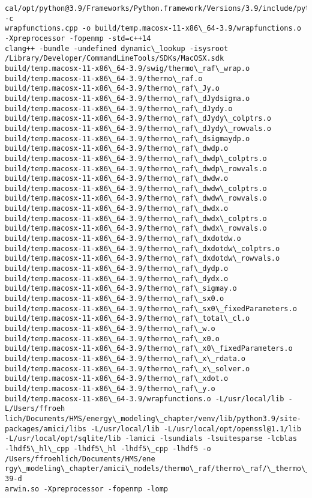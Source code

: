 \documentclass[11pt]{article}
\begin{document}
\begin{Verbatim}[commandchars=\\\{\}]
cal/opt/python@3.9/Frameworks/Python.framework/Versions/3.9/include/python3.9 -c
wrapfunctions.cpp -o build/temp.macosx-11-x86\_64-3.9/wrapfunctions.o
-Xpreprocessor -fopenmp -std=c++14
clang++ -bundle -undefined dynamic\_lookup -isysroot
/Library/Developer/CommandLineTools/SDKs/MacOSX.sdk
build/temp.macosx-11-x86\_64-3.9/swig/thermo\_raf\_wrap.o
build/temp.macosx-11-x86\_64-3.9/thermo\_raf.o
build/temp.macosx-11-x86\_64-3.9/thermo\_raf\_Jy.o
build/temp.macosx-11-x86\_64-3.9/thermo\_raf\_dJydsigma.o
build/temp.macosx-11-x86\_64-3.9/thermo\_raf\_dJydy.o
build/temp.macosx-11-x86\_64-3.9/thermo\_raf\_dJydy\_colptrs.o
build/temp.macosx-11-x86\_64-3.9/thermo\_raf\_dJydy\_rowvals.o
build/temp.macosx-11-x86\_64-3.9/thermo\_raf\_dsigmaydp.o
build/temp.macosx-11-x86\_64-3.9/thermo\_raf\_dwdp.o
build/temp.macosx-11-x86\_64-3.9/thermo\_raf\_dwdp\_colptrs.o
build/temp.macosx-11-x86\_64-3.9/thermo\_raf\_dwdp\_rowvals.o
build/temp.macosx-11-x86\_64-3.9/thermo\_raf\_dwdw.o
build/temp.macosx-11-x86\_64-3.9/thermo\_raf\_dwdw\_colptrs.o
build/temp.macosx-11-x86\_64-3.9/thermo\_raf\_dwdw\_rowvals.o
build/temp.macosx-11-x86\_64-3.9/thermo\_raf\_dwdx.o
build/temp.macosx-11-x86\_64-3.9/thermo\_raf\_dwdx\_colptrs.o
build/temp.macosx-11-x86\_64-3.9/thermo\_raf\_dwdx\_rowvals.o
build/temp.macosx-11-x86\_64-3.9/thermo\_raf\_dxdotdw.o
build/temp.macosx-11-x86\_64-3.9/thermo\_raf\_dxdotdw\_colptrs.o
build/temp.macosx-11-x86\_64-3.9/thermo\_raf\_dxdotdw\_rowvals.o
build/temp.macosx-11-x86\_64-3.9/thermo\_raf\_dydp.o
build/temp.macosx-11-x86\_64-3.9/thermo\_raf\_dydx.o
build/temp.macosx-11-x86\_64-3.9/thermo\_raf\_sigmay.o
build/temp.macosx-11-x86\_64-3.9/thermo\_raf\_sx0.o
build/temp.macosx-11-x86\_64-3.9/thermo\_raf\_sx0\_fixedParameters.o
build/temp.macosx-11-x86\_64-3.9/thermo\_raf\_total\_cl.o
build/temp.macosx-11-x86\_64-3.9/thermo\_raf\_w.o
build/temp.macosx-11-x86\_64-3.9/thermo\_raf\_x0.o
build/temp.macosx-11-x86\_64-3.9/thermo\_raf\_x0\_fixedParameters.o
build/temp.macosx-11-x86\_64-3.9/thermo\_raf\_x\_rdata.o
build/temp.macosx-11-x86\_64-3.9/thermo\_raf\_x\_solver.o
build/temp.macosx-11-x86\_64-3.9/thermo\_raf\_xdot.o
build/temp.macosx-11-x86\_64-3.9/thermo\_raf\_y.o
build/temp.macosx-11-x86\_64-3.9/wrapfunctions.o -L/usr/local/lib -L/Users/ffroeh
lich/Documents/HMS/energy\_modeling\_chapter/venv/lib/python3.9/site-
packages/amici/libs -L/usr/local/lib -L/usr/local/opt/openssl@1.1/lib
-L/usr/local/opt/sqlite/lib -lamici -lsundials -lsuitesparse -lcblas
-lhdf5\_hl\_cpp -lhdf5\_hl -lhdf5\_cpp -lhdf5 -o /Users/ffroehlich/Documents/HMS/ene
rgy\_modeling\_chapter/amici\_models/thermo\_raf/thermo\_raf/\_thermo\_raf.cpython-39-d
arwin.so -Xpreprocessor -fopenmp -lomp

    \end{Verbatim}
\end{document}
